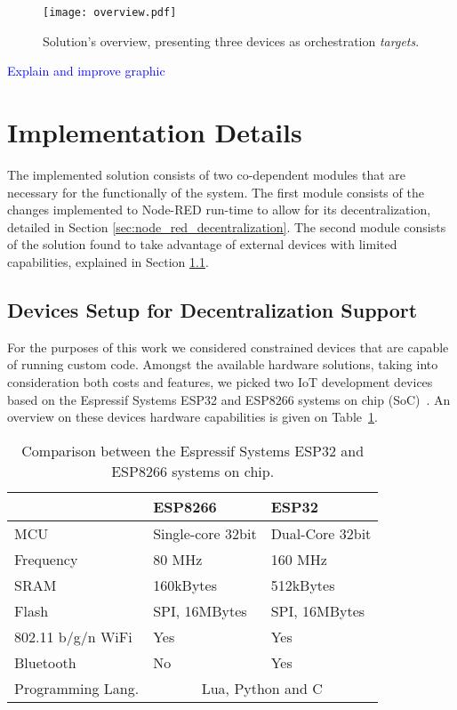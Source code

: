 \begin{figure}[h]
    \centering
    \texttt{[image: overview.pdf]}
    \caption{Solution's overview, presenting three devices as orchestration \textit{targets}.}
    \label{fig:solution_overview}
\end{figure}

\textcolor{blue}{Explain and improve graphic}


\section{Implementation Details}\label{sec:implementation_details}

The implemented solution consists of two co-dependent modules that are necessary for the functionally of the system. The first module consists of the changes implemented to Node-RED run-time to allow for its decentralization, detailed in Section \ref{sec:node_red_decentralization}. The second module consists of the solution found to take advantage of external devices with limited capabilities, explained in Section \ref{sec:devices_decentralization}.

\subsection{Devices Setup for Decentralization Support}\label{sec:devices_decentralization}

For the purposes of this work we considered constrained devices that are capable of running custom code. Amongst the available hardware solutions, taking into consideration both costs and features, we picked two IoT development devices based on the Espressif Systems ESP32 and ESP8266 systems on chip (SoC)~\cite{esp32,esp8266}. An overview on these devices hardware capabilities is given on Table~\ref{tab:esps}.

\begin{table}[]
\centering
\caption{Comparison between the Espressif Systems ESP32 and ESP8266 systems on chip.}
\begin{tabular}{@{}lll@{}}
\toprule
                & \textbf{ESP8266}                   & \textbf{ESP32}                       \\ \midrule
MCU                & Single-core 32bit         & Dual-Core 32bit \\
Frequency          & 80 MHz                    & 160 MHz                     \\
SRAM               & 160kBytes                 & 512kBytes                   \\
Flash              & SPI, 16MBytes             & SPI, 16MBytes               \\
802.11 b/g/n WiFi  & Yes                       & Yes                         \\
Bluetooth          & No                        & Yes                         \\
Programming Lang.  & \multicolumn{2}{c}{Lua, Python and C} \\ \bottomrule
\end{tabular}
\label{tab:esps}
\end{table}

